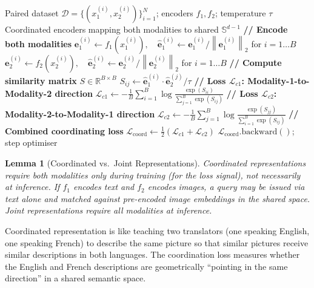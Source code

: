 \documentclass[12pt,a4paper]{article}
\theoremstyle{definition}
\theoremstyle{plain}
\newtheorem{lemma}[theorem]{Lemma}
\theoremstyle{remark}
\newcommand{\R}{\mathbb{R}}
\newcommand{\Sph}{\mathbb{S}}
\newcommand{\Norm}[1]{\left\|#1\right\|_2}
\begin{document}
\begin{algorithm}[H]
\caption{Coordinated Representation Learning (Symmetric Contrastive)}
\label{alg:coord_repr}
\begin{algorithmic}[1]
\Require Paired dataset $\mathcal{D} = \{(x_1^{(i)}, x_2^{(i)})\}_{i=1}^N$; encoders $f_1, f_2$; temperature $\tau$
\Ensure Coordinated encoders mapping both modalities to shared $\Sph^{d-1}$
  \State \textbf{// Encode both modalities}
  \State $\mathbf{e}_1^{(i)} \gets f_1(x_1^{(i)}), \quad \hat{\mathbf{e}}_1^{(i)} \gets \mathbf{e}_1^{(i)}/\Norm{\mathbf{e}_1^{(i)}}$ for $i=1\ldots B$
  \State $\mathbf{e}_2^{(i)} \gets f_2(x_2^{(i)}), \quad \hat{\mathbf{e}}_2^{(i)} \gets \mathbf{e}_2^{(i)}/\Norm{\mathbf{e}_2^{(i)}}$ for $i=1\ldots B$
  \State \textbf{// Compute similarity matrix} $S \in \R^{B \times B}$
  \State $S_{ij} \gets \hat{\mathbf{e}}_1^{(i)} \cdot \hat{\mathbf{e}}_2^{(j)} / \tau$
  \State \textbf{// Loss $\mathcal{L}_{c1}$: Modality-1-to-Modality-2 direction}
  \State $\mathcal{L}_{c1} \gets -\frac{1}{B}\sum_{i=1}^B\log\frac{\exp(S_{ii})}{\sum_{j=1}^B \exp(S_{ij})}$
  \State \textbf{// Loss $\mathcal{L}_{c2}$: Modality-2-to-Modality-1 direction}
  \State $\mathcal{L}_{c2} \gets -\frac{1}{B}\sum_{j=1}^B\log\frac{\exp(S_{jj})}{\sum_{i=1}^B \exp(S_{ij})}$
  \State \textbf{// Combined coordinating loss}
  \State $\mathcal{L}_{\text{coord}} \gets \frac{1}{2}(\mathcal{L}_{c1} + \mathcal{L}_{c2})$
  \State $\mathcal{L}_{\text{coord}}.\text{backward}()$; step optimiser
\EndFor
\end{algorithmic}
\end{algorithm}

\begin{lemma}[Coordinated vs.\ Joint Representations]
Coordinated representations require both modalities only during training (for the loss signal), not necessarily at inference. If $f_1$ encodes text and $f_2$ encodes images, a query may be issued via text alone and matched against pre-encoded image embeddings in the shared space. Joint representations require all modalities at inference.
\end{lemma}

\begin{tcolorbox}[laymanbox]
Coordinated representation is like teaching two translators (one speaking English, one speaking French) to describe the same picture so that similar pictures receive similar descriptions in both languages. The coordination loss measures whether the English and French descriptions are geometrically ``pointing in the same direction'' in a shared semantic space.
\end{tcolorbox}
\end{document}
